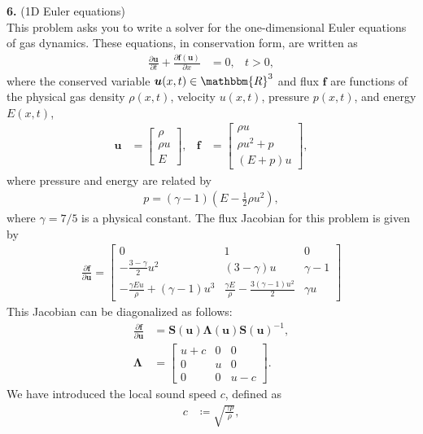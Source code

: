 \documentclass[11pt]{amsart}
\newcommand{\bs}[1]{\boldsymbol{#1}}
\newcommand{\R}{\mathbbm{R}}
\newcommand{\pfpx}[2]{\frac{\partial #1}{\partial #2}}
\begin{document}
  \textbf{6.} (1D Euler equations)\\
  This problem asks you to write a solver for the one-dimensional Euler equations of gas dynamics. These equations, in conservation form, are written as
\begin{align*}
  \pfpx{\bs{u}}{t} + \pfpx{\bs{f(u)}}{x} &= 0, & t > 0,
\end{align*}
where the conserved variable $\bs{u}(x,t) \in \R^3$ and flux $\bs{f}$ are functions of the physical gas density $\rho(x,t)$, velocity $u(x,t)$, pressure $p(x,t)$, and energy $E(x,t)$,
\begin{align*}
\bs{u} &= \left[ \begin{array}{c} \rho \\ \rho u \\ E \end{array}\right], & \bs{f} &= \left[\begin{array}{c} \rho u \\ \rho u^2 + p \\ (E + p) u \end{array}\right],
\end{align*}
where pressure and energy are related by
\begin{align*}
  p = \left(\gamma - 1\right) \left( E - \frac{1}{2} \rho u^2 \right),
\end{align*}
where $\gamma = 7/5$ is a physical constant.
The flux Jacobian for this problem is given by
\begin{align*}
  \pfpx{\bs{f}}{\bs{u}} = \left[ \begin{array}{ccc}
                                0 & 1 & 0 \\
      -\frac{3 - \gamma}{2} u^2 & (3 - \gamma) u & \gamma - 1 \\
  -\frac{\gamma E u}{\rho} + (\gamma - 1) u^3 & \frac{\gamma E}{\rho} - \frac{3(\gamma-1) u^2}{2} & \gamma u \end{array}\right]
\end{align*}
This Jacobian can be diagonalized as follows:
\begin{align*}
  \pfpx{\bs{f}}{\bs{u}} &= \bs{S}(\bs{u}) \bs{\Lambda}(\bs{u}) \bs{S}(\bs{u})^{-1}, \\
  \bs{\Lambda} &= \left[\begin{array}{ccc}
                   u+c & 0 & 0 \\
                   0 & u & 0 \\
                   0 & 0 & u-c \end{array}\right].
\end{align*}
We have introduced the local sound speed $c$, defined as 
\begin{align*}
  c &\coloneqq \sqrt{\frac{\gamma p}{\rho}}, 
\end{align*}
\end{document}
